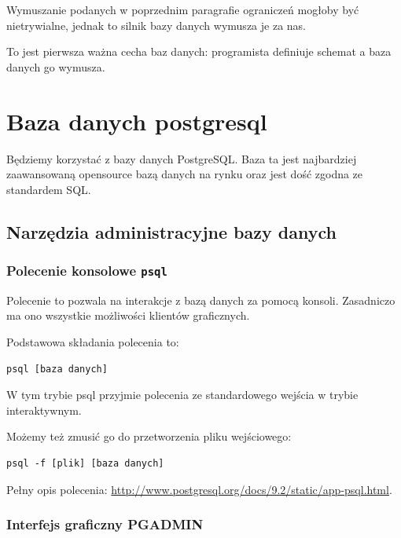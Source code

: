 \documentclass[a4paper]{article}
\begin{document}
Wymuszanie podanych w poprzednim paragrafie ograniczeń mogłoby być
nietrywialne, jednak to silnik bazy danych wymusza je za nas.

To jest pierwsza ważna cecha baz danych: programista definiuje
schemat a baza danych go wymusza.


\section{Baza danych postgresql%
  \label{baza-danych-postgresql}%
}

Będziemy korzystać z bazy danych PostgreSQL. Baza ta jest najbardziej
zaawansowaną opensource bazą danych na rynku oraz jest dość zgodna
ze standardem SQL.


\subsection{Narzędzia administracyjne bazy danych%
  \label{narzedzia-administracyjne-bazy-danych}%
}


\subsubsection{Polecenie konsolowe \texttt{psql}%
  \label{polecenie-konsolowe-psql}%
}

Polecenie to pozwala na interakcje z bazą danych za pomocą
konsoli. Zasadniczo ma ono wszystkie możliwości klientów
graficznych.

Podstawowa składania polecenia to:

\begin{verbatim}
psql [baza danych]
\end{verbatim}

W tym trybie psql przyjmie polecenia ze standardowego wejścia
w trybie interaktywnym.

Możemy też zmusić go do przetworzenia pliku wejściowego:

\begin{verbatim}
psql -f [plik] [baza danych]
\end{verbatim}

Pełny opis polecenia: \url{http://www.postgresql.org/docs/9.2/static/app-psql.html}.


\subsubsection{Interfejs graficzny PGADMIN%
  \label{interfejs-graficzny-pgadmin}%
}
\end{document}
